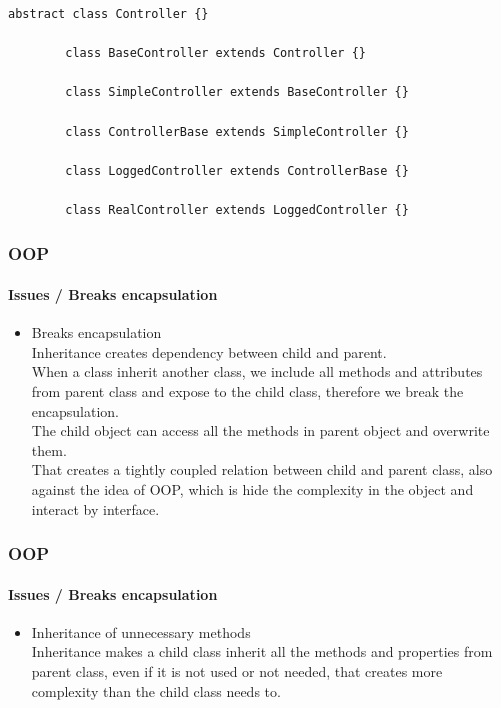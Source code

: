 \begin{frame}[fragile,c]
\begin{minipage}{.80\textwidth}
\begin{lstlisting}[numbers=none]
        abstract class Controller {}

        class BaseController extends Controller {}

        class SimpleController extends BaseController {}

        class ControllerBase extends SimpleController {}

        class LoggedController extends ControllerBase {}

        class RealController extends LoggedController {}
        \end{lstlisting}
    \end{minipage}
\end{frame}

\begin{frame}
    \frametitle{OOP}
    \framesubtitle{Issues / Breaks encapsulation}

    \begin{itemize}
        \item Breaks encapsulation\pause
              \textcolor{ecgrey!50}{
              \\Inheritance creates dependency between child and parent.\pause
              \\When a class inherit another class, we include all methods and attributes from parent
              class and expose to the child class, therefore we break the encapsulation.\pause
              \\The child object can access all the methods in parent object and overwrite them.\pause
              \\That creates a tightly coupled relation between child and parent class,
              also against the idea of OOP, which is hide the complexity in the
              object and interact by interface.}
    \end{itemize}
\end{frame}

\begin{frame}
    \frametitle{OOP}
    \framesubtitle{Issues / Breaks encapsulation}

    \begin{itemize}
        \item Inheritance of unnecessary methods\pause
              \textcolor{ecgrey!50}{
              \\Inheritance makes a child class inherit all the methods
              and properties from parent class, even if it is not used or not needed,
              that creates more complexity than the child class needs to.}
    \end{itemize}
\end{frame}

